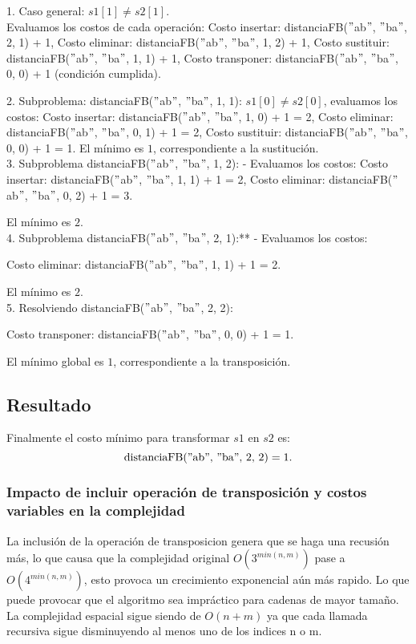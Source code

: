 1. Caso general: \( s1[1] \neq s2[1] \).\\
   Evaluamos los costos de cada operación: Costo insertar: distanciaFB($"$ab$"$, $"$ba$"$, 2, 1) + 1, Costo eliminar: distanciaFB($"$ab$"$, $"$ba$"$, 1, 2) + 1, Costo sustituir: distanciaFB($"$ab$"$, $"$ba$"$, 1, 1) + 1, Costo transponer: distanciaFB($"$ab$"$, $"$ba$"$, 0, 0) + 1 (condición cumplida).

2. Subproblema: distanciaFB($"$ab$"$, $"$ba$"$, 1, 1): \( s1[0] \neq s2[0] \), evaluamos los costos: Costo insertar: distanciaFB($"$ab$"$, $"$ba$"$, 1, 0) + 1 = 2, Costo eliminar: distanciaFB($"$ab$"$, $"$ba$"$, 0, 1) + 1 = 2, Costo sustituir: distanciaFB($"$ab$"$, $"$ba$"$, 0, 0) + 1 = 1.
  El mínimo es \( 1 \), correspondiente a la sustitución.\\

3. Subproblema  distanciaFB($"$ab$"$, $"$ba$"$, 1, 2):
   - Evaluamos los costos:
   Costo insertar: distanciaFB($"$ab$"$, $"$ba$"$, 1, 1) + 1 = 2, 
   Costo eliminar: distanciaFB($"$ab$"$, $"$ba$"$, 0, 2) + 1 = 3.
   
   El mínimo es \( 2 \).\\

4. Subproblema distanciaFB($"$ab$"$, $"$ba$"$, 2, 1):**
   - Evaluamos los costos:
   
   Costo eliminar: distanciaFB($"$ab$"$, $"$ba$"$, 1, 1) + 1 = 2.
   
   El mínimo es \( 2 \).\\

5. Resolviendo distanciaFB($"$ab$"$, $"$ba$"$, 2, 2):

   Costo transponer: distanciaFB($"$ab$"$, $"$ba$"$, 0, 0) + 1 = 1.

   El mínimo global es \( 1 \), correspondiente a la transposición.

\subsection*{Resultado}
Finalmente el costo mínimo para transformar \( s1 \) en \( s2 \) es:
\[
\text{distanciaFB($"$ab$"$, $"$ba$"$, 2, 2)} = 1.
\]

\subsubsection{Impacto de incluir operación de transposición y costos variables en la complejidad}
La inclusión de la operación de transposicion genera que se haga una recusión más, lo que causa que la complejidad original \(O(3^{min(n,m)})\) pase a \(O(4^{min(n,m)})\), esto provoca un crecimiento exponencial aún más rapido. 
Lo que puede provocar que el algoritmo sea impráctico para cadenas de mayor tamaño.
La complejidad espacial sigue siendo de \(O(n+m)\) ya que cada llamada recursiva sigue disminuyendo al menos uno de los indices n o m.

